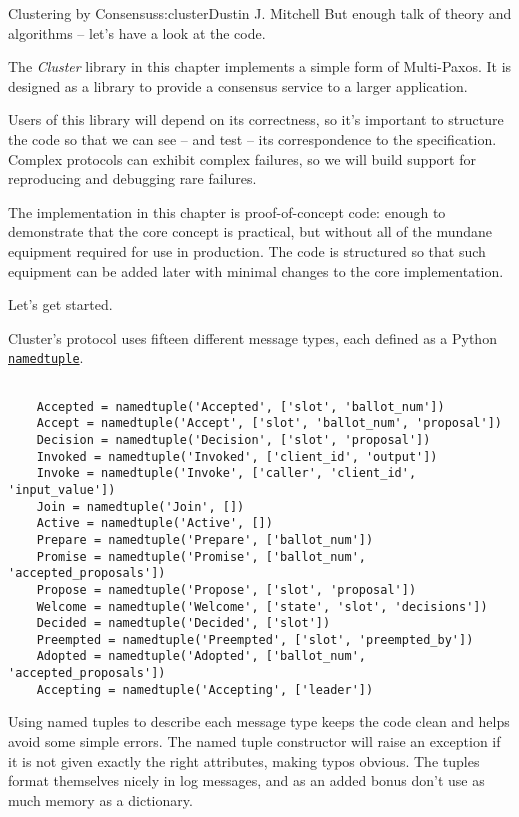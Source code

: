 \begin{aosachapter}{Clustering by Consensus}{s:cluster}{Dustin J. Mitchell}
But enough talk of theory and algorithms -- let's have a look at the
code.

\label{introducing-cluster}

The \emph{Cluster} library in this chapter implements a simple form of
Multi-Paxos. It is designed as a library to provide a consensus service
to a larger application.

Users of this library will depend on its correctness, so it's important
to structure the code so that we can see -- and test -- its
correspondence to the specification. Complex protocols can exhibit
complex failures, so we will build support for reproducing and debugging
rare failures.

The implementation in this chapter is proof-of-concept code: enough to
demonstrate that the core concept is practical, but without all of the
mundane equipment required for use in production. The code is structured
so that such equipment can be added later with minimal changes to the
core implementation.

Let's get started.

\label{types-and-constants}

Cluster's protocol uses fifteen different message types, each defined as
a Python
\href{https://docs.python.org/3/library/collections.html}{\texttt{namedtuple}}.

\begin{verbatim}

    Accepted = namedtuple('Accepted', ['slot', 'ballot_num'])
    Accept = namedtuple('Accept', ['slot', 'ballot_num', 'proposal'])
    Decision = namedtuple('Decision', ['slot', 'proposal'])
    Invoked = namedtuple('Invoked', ['client_id', 'output'])
    Invoke = namedtuple('Invoke', ['caller', 'client_id', 'input_value'])
    Join = namedtuple('Join', [])
    Active = namedtuple('Active', [])
    Prepare = namedtuple('Prepare', ['ballot_num'])
    Promise = namedtuple('Promise', ['ballot_num', 'accepted_proposals'])
    Propose = namedtuple('Propose', ['slot', 'proposal'])
    Welcome = namedtuple('Welcome', ['state', 'slot', 'decisions'])
    Decided = namedtuple('Decided', ['slot'])
    Preempted = namedtuple('Preempted', ['slot', 'preempted_by'])
    Adopted = namedtuple('Adopted', ['ballot_num', 'accepted_proposals'])
    Accepting = namedtuple('Accepting', ['leader'])
\end{verbatim}

Using named tuples to describe each message type keeps the code clean
and helps avoid some simple errors. The named tuple constructor will
raise an exception if it is not given exactly the right attributes,
making typos obvious. The tuples format themselves nicely in log
messages, and as an added bonus don't use as much memory as a
dictionary.


\end{aosachapter}
